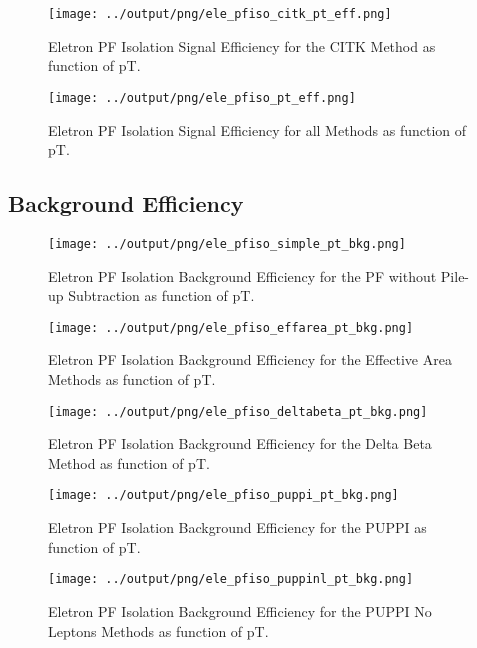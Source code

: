 \documentclass[11pt]{book}
\begin{document}
\begin{figure}[htb]
\centering
\texttt{[image: ../output/png/ele\_pfiso\_citk\_pt\_eff.png]}
\caption{Eletron PF Isolation Signal Efficiency for the CITK Method as function of pT.}
\label{fig:ele_pfiso_pt_eff_citk}
\end{figure}

\begin{figure}[htb]
\centering
\texttt{[image: ../output/png/ele\_pfiso\_pt\_eff.png]}
\caption{Eletron PF Isolation Signal Efficiency for all Methods as function of pT.}
\label{fig:ele_pfiso_pt_eff}
\end{figure}
\clearpage

\subsection{Background Efficiency}
\begin{figure}[htb]
\centering
\texttt{[image: ../output/png/ele\_pfiso\_simple\_pt\_bkg.png]}
\caption{Eletron PF Isolation Background Efficiency for the PF without Pile-up Subtraction as function of pT.}
\label{fig:ele_pfiso_pt_bkg_simple}
\end{figure}

\begin{figure}[htb]
\centering
\texttt{[image: ../output/png/ele\_pfiso\_effarea\_pt\_bkg.png]}
\caption{Eletron PF Isolation Background Efficiency for the Effective Area Methods as function of pT.}
\label{fig:ele_pfiso_pt_bkg_effarea}
\end{figure}

\begin{figure}[htb]
\centering
\texttt{[image: ../output/png/ele\_pfiso\_deltabeta\_pt\_bkg.png]}
\caption{Eletron PF Isolation Background Efficiency for the Delta Beta Method as function of pT.}
\label{fig:ele_pfiso_pt_bkg_deltabeta}
\end{figure}

\begin{figure}[htb]
\centering
\texttt{[image: ../output/png/ele\_pfiso\_puppi\_pt\_bkg.png]}
\caption{Eletron PF Isolation Background Efficiency for the PUPPI as function of pT.}
\label{fig:ele_pfiso_pt_bkg_puppi}
\end{figure}

\begin{figure}[htb]
\centering
\texttt{[image: ../output/png/ele\_pfiso\_puppinl\_pt\_bkg.png]}
\caption{Eletron PF Isolation Background Efficiency for the PUPPI No Leptons Methods as function of pT.}
\label{fig:ele_pfiso_pt_bkg_puppinl}
\end{figure}
\end{document}
